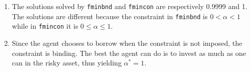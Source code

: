 \begin{enumerate}
\begin{enumerate}
\item
The solutions solved by \texttt{fminbnd} and \texttt{fmincon} are respectively 0.9999 and 1. The solutions are different because the constraint in \texttt{fminbnd} is $0<\alpha<1$ while in \texttt{fmincon} it is $0\le\alpha\le1$.

\item
Since the agent chooses to borrow when the constraint is not imposed, the constraint is binding. The best the agent can do is to invest as much as one can in the risky asset, thus yielding $\alpha^*=1$.

\end{enumerate}

\end{enumerate}
